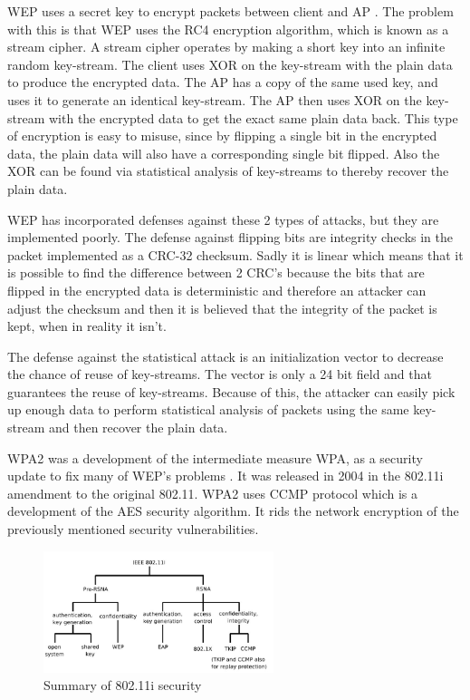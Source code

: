 WEP uses a secret key to encrypt packets between client and AP \cite{WEP2}. The problem with this is that WEP uses the RC4 encryption algorithm, which is known as a stream cipher. A stream cipher operates by making a short key into an infinite random key-stream. The client uses XOR on the key-stream with the plain data to produce the encrypted data. The AP has a copy of the same used key, and uses it to generate an identical key-stream. The AP then uses XOR on the key-stream with the encrypted data to get the exact same plain data back. This type of encryption is easy to misuse, since by flipping a single bit in the encrypted data, the plain data will also have a corresponding single bit flipped. Also the XOR can be found via statistical analysis of key-streams to thereby recover the plain data.

WEP has incorporated defenses against these 2 types of attacks, but they are implemented poorly. The defense against flipping bits are integrity checks in the packet implemented as a CRC-32 checksum. Sadly it is linear which means that it is possible to find the difference between 2 CRC's because the bits that are flipped in the encrypted data is deterministic and therefore an attacker can adjust the checksum and then it is believed that the integrity of the packet is kept, when in reality it isn't.

The defense against the statistical attack is an initialization vector to decrease the chance of reuse of key-streams. The vector is only a 24 bit field and that guarantees the reuse of key-streams. Because of this, the attacker can easily pick up enough data to perform statistical analysis of packets using the same key-stream and then recover the plain data.

WPA2 was a development of the intermediate measure WPA, as a security update to fix many of WEP's problems \cite{WPA2_1}\cite{WEP3}. It was released in 2004 in the 802.11i amendment to the original 802.11. WPA2 uses CCMP protocol which is a development of the AES security algorithm. It rids the network encryption of the previously mentioned security vulnerabilities. 
\\
\begin{figure}[!htbp]
    \centering
    \includegraphics[width=0.6\textwidth]{Latex-Files/Billeder/802.11i security.png}
    \caption{Summary of 802.11i security \cite{WPA2_3}}
    \label{802.11 Security}
\end{figure}

